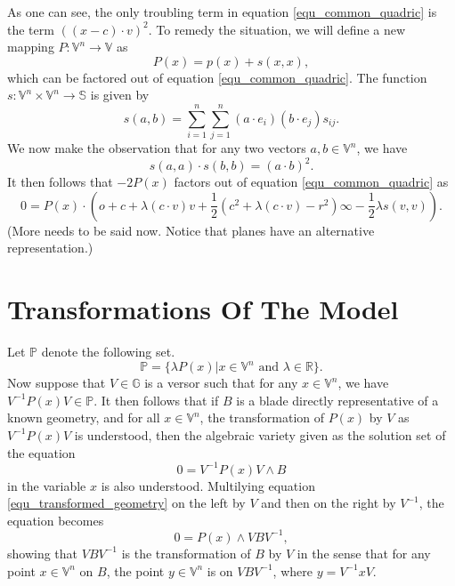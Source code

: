\documentclass{birkjour}
\theoremstyle{definition}
\theoremstyle{remark}
\numberwithin{equation}{section}
\newcommand{\G}{\mathbb{G}}
\newcommand{\V}{\mathbb{V}}
\newcommand{\R}{\mathbb{R}}
\newcommand{\VS}{\mathbb{S}}
\newcommand{\PS}{\mathbb{P}}
\newcommand{\nvao}{o}
\newcommand{\nvai}{\infty}
\begin{document}
As one can see, the only troubling term in equation \eqref{equ_common_quadric} is the
term $((x-c)\cdot v)^2$.  To remedy the situation, we will define a new mapping
$P:\V^n\to\V$ as
\begin{equation}
P(x) = p(x)+s(x,x),
\end{equation}
which can be factored out of equation \eqref{equ_common_quadric}.  The
function $s:\V^n\times\V^n\to\VS$ is given by
\begin{equation}
s(a,b) = \sum_{i=1}^n\sum_{j=1}^n(a\cdot e_i)(b\cdot e_j)s_{ij}.
\end{equation}
We now make the observation that for any two vectors $a,b\in\V^n$, we have
\begin{equation}
s(a,a)\cdot s(b,b) = (a\cdot b)^2.
\end{equation}
It then follows that $-2P(x)$ factors out of equation \eqref{equ_common_quadric} as
\begin{equation}
0 = P(x)\cdot\left(\nvao+c+\lambda(c\cdot v)v+\frac{1}{2}(c^2+\lambda(c\cdot v)-r^2)\nvai-
\frac{1}{2}\lambda s(v,v)\right).
\end{equation}
(More needs to be said now.  Notice that planes have an alternative representation.)

\section{Transformations Of The Model}

Let $\PS$ denote the following set.
\begin{equation}
\PS = \{\lambda P(x)|\mbox{$x\in\V^n$ and $\lambda\in\R$}\}.
\end{equation}
Now suppose that $V\in\G$ is a versor such that for any $x\in\V^n$,
we have $V^{-1}P(x)V\in\PS$.  It then follows that if $B$ is a blade
directly representative of a known geometry, and for all $x\in\V^n$,
the transformation of $P(x)$ by $V$ as $V^{-1}P(x)V$ is understood,
then the algebraic variety given as the solution set of the equation
\begin{equation}\label{equ_transformed_geometry}
0 = V^{-1}P(x)V\wedge B
\end{equation}
in the variable $x$ is also understood.  Multilying equation
\eqref{equ_transformed_geometry} on the left by $V$ and then on the
right by $V^{-1}$, the equation becomes
\begin{equation}
0 = P(x)\wedge VBV^{-1},
\end{equation}
showing that $VBV^{-1}$ is the transformation of $B$ by $V$ in the sense
that for any point $x\in\V^n$ on $B$, the point $y\in\V^n$ is on $VBV^{-1}$,
where $y=V^{-1}xV$.
\end{document}
